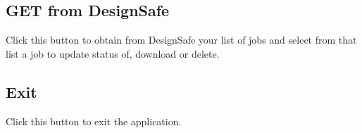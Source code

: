 \subsection{GET from DesignSafe}
	Click this button to obtain from DesignSafe your list of jobs and select from that list a job to update status of, download or delete.

\subsection{Exit}
Click this button to exit the application. 
